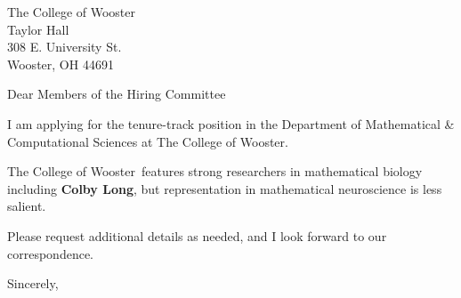 




	
	
	\def\School{The College of Wooster}
	
	\begin{letter}
		{The College of Wooster\\
			Taylor Hall\\
			308 E. University St.\\
			Wooster, OH 44691\\
		}
		
		\opening{Dear Members of the Hiring Committee}
		
		
		I am applying for the tenure-track position in the Department of Mathematical \& Computational Sciences at \School. 
		
		
		
		\School~features strong researchers in mathematical biology including \textbf{Colby Long}, but representation in mathematical neuroscience is less salient. 
		
		
		
		
		
		Please request additional details as needed, and I look forward to our correspondence.
		
		\closing{Sincerely,}
	\end{letter}
